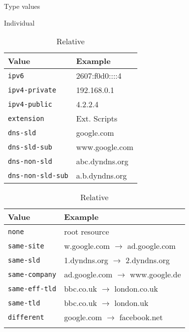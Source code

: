 \begin{table}[t]
    \centering
    \footnotesize
    \label{inclusion:tab:type}
    \caption{Type values}
    \begin{subtable}{.43\textwidth}
        \centering
        \caption{Individual}
        \label{inclusion:tab:type:individual}
        \begin{tabular}{ll}
            \toprule
            \textbf{Value} & \textbf{Example} \\
            \midrule
            \texttt{ipv6} & 2607:f0d0::::4 \\
            \texttt{ipv4-private} & 192.168.0.1 \\
            \texttt{ipv4-public} & 4.2.2.4 \\
            \texttt{extension} & Ext. Scripts \\
            \texttt{dns-sld} & google.com \\
            \texttt{dns-sld-sub} & www.google.com \\
            \texttt{dns-non-sld} & abc.dyndns.org \\
            \texttt{dns-non-sld-sub} & a.b.dyndns.org \\
            \bottomrule
        \end{tabular}
    \end{subtable}
    \begin{subtable}{.54\textwidth}
        \centering
        \caption{Relative}
        \label{inclusion:tab:type:relative}
        \begin{tabular}{ll}
            \toprule
            \textbf{Value} & \textbf{Example} \\
            \midrule
            \texttt{none} & root resource \\
            \texttt{same-site} & w.google.com $\rightarrow$ ad.google.com \\
            \texttt{same-sld} & 1.dyndns.org $\rightarrow$ 2.dyndns.org \\
            \texttt{same-company} & ad.google.com $\rightarrow$ www.google.de \\
            \texttt{same-eff-tld} & bbc.co.uk $\rightarrow$ london.co.uk \\
            \texttt{same-tld} & bbc.co.uk $\rightarrow$ london.uk \\
            \texttt{different} & google.com $\rightarrow$ facebook.net \\
            \bottomrule
            \\
        \end{tabular}
    \end{subtable} 
\end{table}
